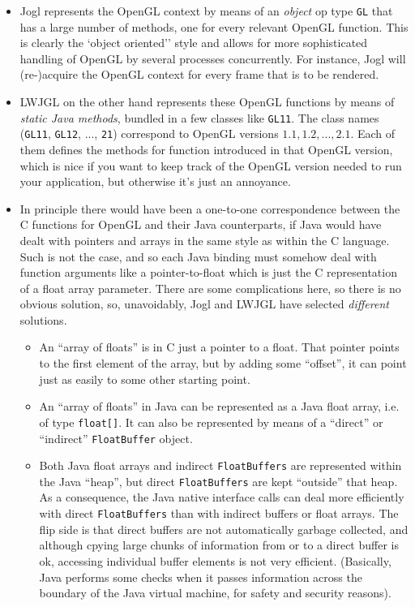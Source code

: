 \begin{itemize}
\item Jogl represents the OpenGL context by means of an \emph{object} op type \verb"GL" that has a large number of methods, one for every relevant OpenGL function.  This is clearly the `object oriented'' style 
    and allows for more sophisticated handling of OpenGL by several processes concurrently. For instance, Jogl will
    (re-)acquire the OpenGL context  for every frame that is to be rendered. 
\item LWJGL on the other hand represents these OpenGL functions by means of \emph{static Java methods}, bundled in a few classes like \verb"GL11".
    The class names (\verb"GL11", \verb"GL12", ..., \verb"21") correspond to OpenGL versions $1.1, 1.2, ..., 2.1$.
    Each of them defines the methods for function introduced in that OpenGL version, which is nice if you want to keep track of the OpenGL version needed to run your application, but otherwise it's just an annoyance.  
\item In principle there would have been a one-to-one correspondence between the C functions for OpenGL and their Java counterparts, if Java would have dealt with pointers and arrays in the same style as within the C language. Such is not the case, and so each Java binding must somehow deal with function arguments like a pointer-to-float which is just the C representation of a float array parameter. There are some complications here, so there is no obvious solution, so, unavoidably,  Jogl and LWJGL have selected \emph{different} solutions.
    \begin{itemize}
     \item An ``array of floats'' is in C just a pointer to a float. That pointer points to the first element
     of the array, but by adding some ``offset'', it can point just as easily to some other starting point.
     \item An ``array of floats'' in Java can be represented as a Java float array, i.e. of type \verb"float[]".
     It can also be represented by means of a ``direct'' or ``indirect'' \verb"FloatBuffer" object. 
     \item Both Java float arrays and indirect \verb"FloatBuffers" are represented within the Java ``heap'', but direct \verb"FloatBuffers" are kept ``outside'' that heap. As a consequence, the Java native interface calls         can deal more efficiently with direct \verb"FloatBuffers" than with indirect buffers or float arrays. The flip side is that direct buffers are not automatically garbage collected, and although cpying large chunks of information from or to a direct buffer is ok, accessing individual buffer elements is not very efficient. (Basically, Java performs some checks when it passes information across the boundary of the Java virtual machine, for safety and security reasons). 

\end{itemize}
\end{itemize}
